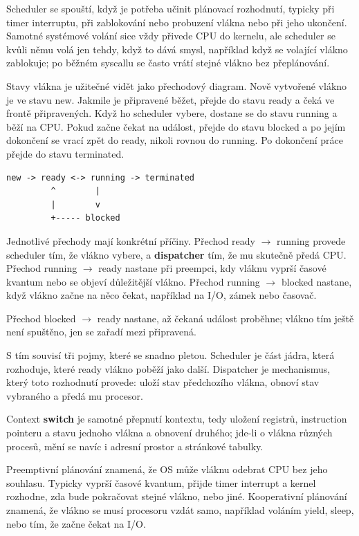 Scheduler se spouští, když je potřeba učinit plánovací rozhodnutí, typicky při timer interruptu, při zablokování nebo probuzení vlákna nebo při jeho ukončení. Samotné systémové volání sice vždy přivede CPU do kernelu, ale scheduler se kvůli němu volá jen tehdy, když to dává smysl, například když se volající vlákno zablokuje; po běžném syscallu se často vrátí stejné vlákno bez přeplánování.

Stavy vlákna je užitečné vidět jako přechodový diagram. Nově vytvořené vlákno je ve stavu new. Jakmile je připravené běžet, přejde do stavu ready a čeká ve frontě připravených. Když ho scheduler vybere, dostane se do stavu running a běží na CPU. Pokud začne čekat na událost, přejde do stavu blocked a po jejím dokončení se vrací zpět do ready, nikoli rovnou do running. Po dokončení práce přejde do stavu terminated.

\begin{codebox}
\small
\begin{verbatim}
new -> ready <-> running -> terminated
         ^        |
         |        v
         +----- blocked
\end{verbatim}
\end{codebox}

Jednotlivé přechody mají konkrétní příčiny. Přechod ready $\rightarrow$ running provede scheduler tím, že vlákno vybere, a \textbf{dispatcher} tím, že mu skutečně předá CPU. Přechod running $\rightarrow$ ready nastane při preempci, kdy vláknu vyprší časové kvantum nebo se objeví důležitější vlákno. Přechod running $\rightarrow$ blocked nastane, když vlákno začne na něco čekat, například na I/O, zámek nebo časovač.

Přechod blocked $\rightarrow$ ready nastane, až čekaná událost proběhne; vlákno tím ještě není spuštěno, jen se zařadí mezi připravená.

S tím souvisí tři pojmy, které se snadno pletou. Scheduler je část jádra, která rozhoduje, které ready vlákno poběží jako další. Dispatcher je mechanismus, který toto rozhodnutí provede: uloží stav předchozího vlákna, obnoví stav vybraného a předá mu procesor.

Context \textbf{switch} je samotné přepnutí kontextu, tedy uložení registrů, instruction pointeru a stavu jednoho vlákna a obnovení druhého; jde-li o vlákna různých procesů, mění se navíc i adresní prostor a stránkové tabulky.

Preemptivní plánování znamená, že OS může vláknu odebrat CPU bez jeho souhlasu. Typicky vyprší časové kvantum, přijde timer interrupt a kernel rozhodne, zda bude pokračovat stejné vlákno, nebo jiné. Kooperativní plánování znamená, že vlákno se musí procesoru vzdát samo, například voláním yield, sleep, nebo tím, že začne čekat na I/O.

